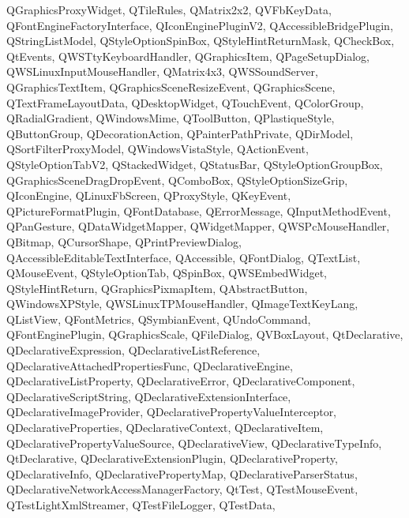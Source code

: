 {{    QGraphicsProxyWidget,%
    QTileRules,%
    QMatrix2x2,%
    QVFbKeyData,%
    QFontEngineFactoryInterface,%
    QIconEnginePluginV2,%
    QAccessibleBridgePlugin,%
    QStringListModel,%
    QStyleOptionSpinBox,%
    QStyleHintReturnMask,%
    QCheckBox,%
    QtEvents,%
    QWSTtyKeyboardHandler,%
    QGraphicsItem,%
    QPageSetupDialog,%
    QWSLinuxInputMouseHandler,%
    QMatrix4x3,%
    QWSSoundServer,%
    QGraphicsTextItem,%
    QGraphicsSceneResizeEvent,%
    QGraphicsScene,%
    QTextFrameLayoutData,%
    QDesktopWidget,%
    QTouchEvent,%
    QColorGroup,%
    QRadialGradient,%
    QWindowsMime,%
    QToolButton,%
    QPlastiqueStyle,%
    QButtonGroup,%
    QDecorationAction,%
    QPainterPathPrivate,%
    QDirModel,%
    QSortFilterProxyModel,%
    QWindowsVistaStyle,%
    QActionEvent,%
    QStyleOptionTabV2,%
    QStackedWidget,%
    QStatusBar,%
    QStyleOptionGroupBox,%
    QGraphicsSceneDragDropEvent,%
    QComboBox,%
    QStyleOptionSizeGrip,%
    QIconEngine,%
    QLinuxFbScreen,%
    QProxyStyle,%
    QKeyEvent,%
    QPictureFormatPlugin,%
    QFontDatabase,%
    QErrorMessage,%
    QInputMethodEvent,%
    QPanGesture,%
    QDataWidgetMapper,%
    QWidgetMapper,%
    QWSPcMouseHandler,%
    QBitmap,%
    QCursorShape,%
    QPrintPreviewDialog,%
    QAccessibleEditableTextInterface,%
    QAccessible,%
    QFontDialog,%
    QTextList,%
    QMouseEvent,%
    QStyleOptionTab,%
    QSpinBox,%
    QWSEmbedWidget,%
    QStyleHintReturn,%
    QGraphicsPixmapItem,%
    QAbstractButton,%
    QWindowsXPStyle,%
    QWSLinuxTPMouseHandler,%
    QImageTextKeyLang,%
    QListView,%
    QFontMetrics,%
    QSymbianEvent,%
    QUndoCommand,%
    QFontEnginePlugin,%
    QGraphicsScale,%
    QFileDialog,%
    QVBoxLayout,%
    QtDeclarative,%
    QDeclarativeExpression,%
    QDeclarativeListReference,%
    QDeclarativeAttachedPropertiesFunc,%
    QDeclarativeEngine,%
    QDeclarativeListProperty,%
    QDeclarativeError,%
    QDeclarativeComponent,%
    QDeclarativeScriptString,%
    QDeclarativeExtensionInterface,%
    QDeclarativeImageProvider,%
    QDeclarativePropertyValueInterceptor,%
    QDeclarativeProperties,%
    QDeclarativeContext,%
    QDeclarativeItem,%
    QDeclarativePropertyValueSource,%
    QDeclarativeView,%
    QDeclarativeTypeInfo,%
    QtDeclarative,%
    QDeclarativeExtensionPlugin,%
    QDeclarativeProperty,%
    QDeclarativeInfo,%
    QDeclarativePropertyMap,%
    QDeclarativeParserStatus,%
    QDeclarativeNetworkAccessManagerFactory,%
    QtTest,%
    QTestMouseEvent,%
    QTestLightXmlStreamer,%
    QTestFileLogger,%
    QTestData,%
}}
